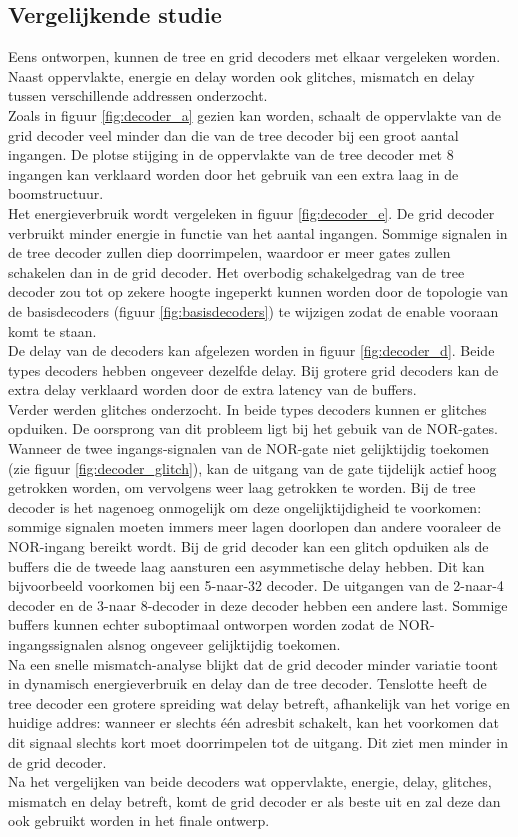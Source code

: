 \subsection{Vergelijkende studie}
Eens ontworpen, kunnen de tree en grid decoders met elkaar vergeleken worden. Naast oppervlakte, energie en delay worden ook glitches, mismatch en delay tussen verschillende addressen onderzocht. \\
Zoals in figuur \ref{fig:decoder_a} gezien kan worden, schaalt de oppervlakte van de grid decoder veel minder dan die van de tree decoder bij een groot aantal ingangen. De plotse stijging in de oppervlakte van de tree decoder met 8 ingangen kan verklaard worden door het gebruik van een extra laag in de boomstructuur. \\
Het energieverbruik wordt vergeleken in figuur \ref{fig:decoder_e}. De grid decoder verbruikt minder energie in functie van het aantal ingangen. Sommige signalen in de tree decoder zullen diep doorrimpelen, waardoor er meer gates zullen schakelen dan in de grid decoder.  Het overbodig schakelgedrag van de tree decoder zou tot op zekere hoogte ingeperkt kunnen worden door de topologie van de basisdecoders (figuur \ref{fig:basisdecoders}) te wijzigen zodat de enable vooraan komt te staan.\\
De delay van de decoders kan afgelezen worden in figuur \ref{fig:decoder_d}. Beide types decoders hebben ongeveer dezelfde delay. Bij grotere grid decoders kan de extra delay verklaard worden door de extra latency van de buffers.\\
Verder werden glitches onderzocht. In beide types decoders kunnen er glitches opduiken. De oorsprong van dit probleem ligt bij het gebuik van de NOR-gates. Wanneer de twee ingangs-signalen van de NOR-gate niet gelijktijdig toekomen (zie figuur \ref{fig:decoder_glitch}), kan de uitgang van de gate tijdelijk actief hoog getrokken worden, om vervolgens weer laag getrokken te worden. Bij de tree decoder is het nagenoeg onmogelijk om deze ongelijktijdigheid te voorkomen: sommige signalen moeten immers meer lagen doorlopen dan andere vooraleer de NOR-ingang bereikt wordt. Bij de grid decoder kan een glitch opduiken als de buffers die de tweede laag aansturen een asymmetische delay hebben. Dit kan bijvoorbeeld voorkomen bij een 5-naar-32 decoder. De uitgangen van de 2-naar-4 decoder en de 3-naar 8-decoder in deze decoder hebben een andere last. Sommige buffers kunnen echter suboptimaal ontworpen worden zodat de NOR-ingangssignalen alsnog ongeveer gelijktijdig toekomen.\\
Na een snelle mismatch-analyse blijkt dat de grid decoder minder variatie toont in dynamisch energieverbruik en delay dan de tree decoder. Tenslotte heeft de tree decoder een grotere spreiding wat delay betreft, afhankelijk van het vorige en huidige addres: wanneer er slechts één adresbit schakelt, kan het voorkomen dat dit signaal slechts kort moet doorrimpelen tot de uitgang. Dit ziet men minder in de grid decoder. \\
Na het vergelijken van beide decoders wat oppervlakte, energie, delay, glitches, mismatch en delay betreft, komt de grid decoder er als beste uit en zal deze dan ook gebruikt worden in het finale ontwerp.


